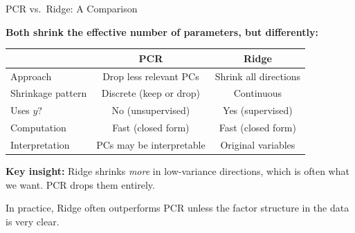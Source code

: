 \documentclass[10pt]{beamer}
\begin{document}
\begin{frame}{PCR vs.\ Ridge: A Comparison}

  \textbf{Both shrink the effective number of parameters, but differently:}

  \vspace{1em}
  \begin{center}
  \begin{tabular}{lcc}
    \toprule
    & \textbf{PCR} & \textbf{Ridge} \\
    \midrule
    Approach & Drop less relevant PCs & Shrink all directions \\
    \addlinespace
    Shrinkage pattern & Discrete (keep or drop) & Continuous \\
    \addlinespace
    Uses $y$? & No (unsupervised) & Yes (supervised) \\
    \addlinespace
    Computation & Fast (closed form) & Fast (closed form) \\
    \addlinespace
    Interpretation & PCs may be interpretable & Original variables \\
    \bottomrule
  \end{tabular}
  \end{center}

  \vspace{0.5em}
  \textbf{Key insight:} Ridge shrinks \emph{more} in low-variance directions, which is often what we want. PCR drops them entirely.

  \vspace{0.3em}
  In practice, Ridge often outperforms PCR unless the factor structure in the data is very clear.
\end{frame}

\end{document}
